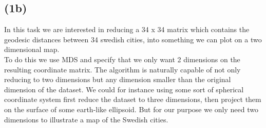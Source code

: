 \documentclass[12pt, letterpaper]{article}
\begin{document}
    \subsection*{(1b)}
      In this task we are interested in reducing a 34 x 34 matrix which contains the geodesic distances between 34 swedish cities, into something we can plot on a two dimensional map.\\
      To do this we use MDS and specify that we only want 2 dimensions on the resulting coordinate matrix. The algorithm is naturally capable of not only reducing to two dimensions but any dimension smaller than the original dimension of the dataset. We could for instance using some sort of spherical coordinate system first reduce the dataset to three dimensions, then project them on the surface of some earth-like ellipsoid. But for our purpose we only need two dimensions to illustrate a map of the Swedish cities.\\
\end{document}
